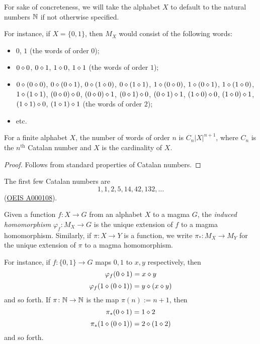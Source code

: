 For sake of concreteness, we will take the alphabet $X$ to default to the natural numbers $\mathbb{N}$ if not otherwise specified.

For instance, if $X = \{0,1\}$, then $M_X$ would consist of the following words:
\begin{itemize}
  \item $0$, $1$ (the words of order $0$);
  \item $0 \diamond 0$, $0 \diamond 1$, $1 \diamond 0$, $1 \diamond 1$ (the words of order $1$);
  \item $0 \diamond (0 \diamond 0)$, $0 \diamond (0 \diamond 1)$, $0 \diamond (1 \diamond 0)$, $0 \diamond (1 \diamond 1)$, $1 \diamond (0 \diamond 0)$, $1 \diamond (0 \diamond 1)$, $1 \diamond (1 \diamond 0)$, $1 \diamond (1 \diamond 1)$, $(0 \diamond 0) \diamond 0$, $(0 \diamond 0) \diamond 1$, $(0 \diamond 1) \diamond 0$, $(0 \diamond 1) \diamond 1$, $(1 \diamond 0) \diamond 0$, $(1 \diamond 0) \diamond 1$, $(1 \diamond 1) \diamond 0$, $(1 \diamond 1) \diamond 1$ (the words of order $2$);
  \item etc.
\end{itemize}

\begin{lemma} \leanok {}
  For a finite alphabet $X$, the number of words of order $n$ is $C_n |X|^{n+1}$, where $C_n$ is the $n^{\mathrm{th}}$ Catalan number and $X$ is the cardinality of $X$.
\end{lemma}

\begin{proof} \leanok
  Follows from standard properties of Catalan numbers.
\end{proof}

The first few Catalan numbers are
$$ 1, 1, 2, 5, 14, 42, 132, \dots$$
(\href{https://oeis.org/A000108}{OEIS A000108}).

\begin{definition}\label{induced-def}
  Given a function $f: X \to G$ from an alphabet $X$ to a magma $G$, the \emph{induced homomorphism} $\varphi_f: M_X \to G$ is the unique extension of $f$ to a magma homomorphism.
  Similarly, if $\pi \colon X \to Y$ is a function, we write $\pi_* \colon M_X \to M_Y$ for the unique extension of $\pi$ to a magma homomorphism.
\end{definition}

For instance, if $f : \{0,1\} \to G$ maps $0,1$ to $x,y$ respectively, then
$$ \varphi_f(0 \diamond 1) = x \diamond y$$
$$ \varphi_f(1 \diamond (0 \diamond 1)) = y \diamond (x \diamond y)$$
and so forth. If $\pi \colon \mathbb{N} \to \mathbb{N}$ is the map $\pi(n) := n+1$, then
$$ \pi_*(0 \diamond 1) = 1 \diamond 2$$
$$ \pi_*(1 \diamond (0 \diamond 1)) = 2 \diamond (1 \diamond 2)$$
and so forth.

